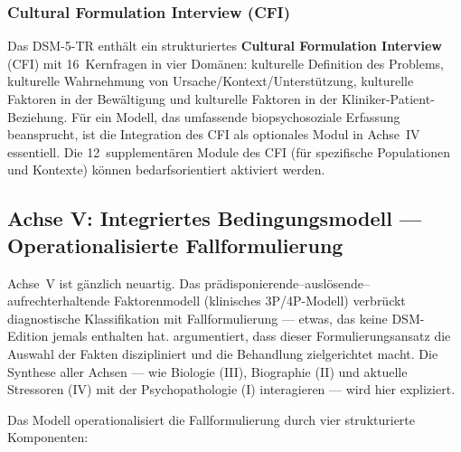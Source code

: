 \documentclass[11pt,a4paper]{article}
\begin{document}
\subsubsection{Cultural Formulation Interview (CFI)}

Das DSM-5-TR enth\"alt ein strukturiertes \textbf{Cultural Formulation Interview} (CFI) mit 16~Kernfragen in vier Dom\"anen: kulturelle Definition des Problems, kulturelle Wahrnehmung von Ursache/Kontext/Unterst\"utzung, kulturelle Faktoren in der Bew\"altigung und kulturelle Faktoren in der Kliniker-Patient-Beziehung. F\"ur ein Modell, das umfassende biopsychosoziale Erfassung beansprucht, ist die Integration des CFI als optionales Modul in Achse~IV essentiell. Die 12~supplementären Module des CFI (f\"ur spezifische Populationen und Kontexte) k\"onnen bedarfsorientiert aktiviert werden.

\subsection{Achse V: Integriertes Bedingungsmodell --- Operationalisierte Fallformulierung}
\label{sec:achse5}

Achse~V ist g\"anzlich neuartig. Das pr\"adisponierende--ausl\"osende--aufrechterhaltende Faktorenmodell (klinisches 3P/4P-Modell) verbr\"uckt diagnostische Klassifikation mit Fallformulierung --- etwas, das keine DSM-Edition jemals enthalten hat. \citet{Owen2023Formulation} argumentiert, dass dieser Formulierungsansatz \glqq die Auswahl der Fakten diszipliniert und die Behandlung zielgerichtet macht\grqq{}. Die Synthese aller Achsen --- wie Biologie (III), Biographie (II) und aktuelle Stressoren (IV) mit der Psychopathologie (I) interagieren --- wird hier expliziert.

Das Modell operationalisiert die Fallformulierung durch vier strukturierte Komponenten:
\end{document}

